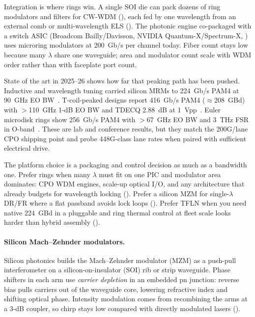 Integration is where rings win. A single SOI die can pack dozens of ring
modulators and filters for CW-WDM (), each fed by one
wavelength from an external comb or multi-wavelength ELS (). The
photonic engine co-packaged with a switch ASIC (Broadcom Bailly/Davisson, NVIDIA
Quantum-X/Spectrum-X, ) uses microring modulators at
200~Gb/s per channel today. Fiber count stays low because many $\lambda$ share one
waveguide; area and modulator count scale with WDM order rather than with
faceplate port count.

State of the art in 2025--26 shows how far that peaking path has been pushed.
Inductive and wavelength tuning carried silicon MRMs to 224~Gb/s PAM4 at 90~GHz
EO BW~. T-coil-peaked designs report 416~Gb/s PAM4
($\approx$208~GBd) with $>$110~GHz 1-dB EO BW and TDECQ 2.88~dB at
1~Vpp~. Euler microdisk rings show 256~Gb/s PAM4 with
$>$67~GHz EO BW and 3~THz FSR in O-band~. These are lab and
conference results, but they match the 200G/lane CPO shipping point and probe
448G-class lane rates when paired with sufficient electrical drive.

The platform choice is a packaging and control decision as much as a bandwidth
one. Prefer rings when many $\lambda$ must fit on one PIC and modulator area
dominates: CPO WDM engines, scale-up optical I/O, and any architecture that already
budgets for wavelength locking (). Prefer a silicon MZM
for single-$\lambda$ DR/FR where a flat passband avoids lock loops
(). Prefer TFLN when you need native 224~GBd in a pluggable and
ring thermal control at fleet scale looks harder than hybrid assembly
().

\paragraph{Silicon Mach--Zehnder modulators.}
\label{sec:simzm}

Silicon photonics builds the Mach--Zehnder modulator (MZM) as a push-pull
interferometer on a silicon-on-insulator (SOI) rib or strip waveguide. Phase
shifters in each arm use \emph{carrier depletion} in an embedded pn junction:
reverse bias pulls carriers out of the waveguide core, lowering refractive index
and shifting optical phase. Intensity modulation comes from recombining the arms
at a 3-dB coupler, so chirp stays low compared with directly modulated lasers
().

